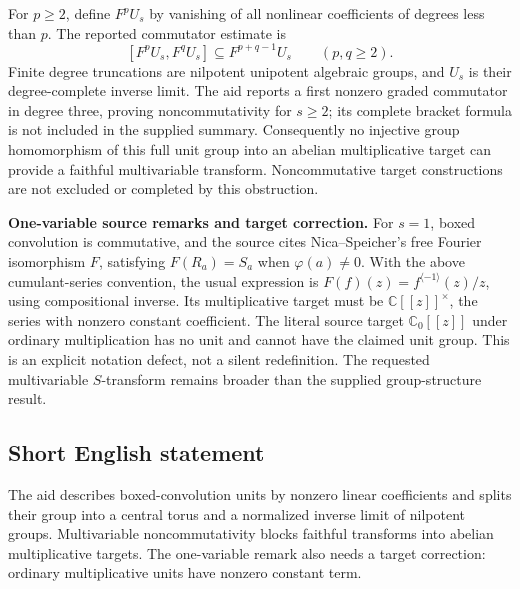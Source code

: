 \documentclass[11pt]{article}
\newcommand{\C}{\mathbb{C}}
\begin{document}
For \(p\geq2\), define \(F^pU_s\) by vanishing of all nonlinear coefficients of degrees less than \(p\). The reported commutator estimate is
\[
 [F^pU_s,F^qU_s]\subseteq F^{p+q-1}U_s\qquad(p,q\geq2).
\]
Finite degree truncations are nilpotent unipotent algebraic groups, and \(U_s\) is their degree-complete inverse limit. The aid reports a first nonzero graded commutator in degree three, proving noncommutativity for \(s\geq2\); its complete bracket formula is not included in the supplied summary. Consequently no injective group homomorphism of this full unit group into an abelian multiplicative target can provide a faithful multivariable transform. Noncommutative target constructions are not excluded or completed by this obstruction.

\textbf{One-variable source remarks and target correction.} For \(s=1\), boxed convolution is commutative, and the source cites Nica--Speicher's free Fourier isomorphism \(F\), satisfying \(F(R_a)=S_a\) when \(\varphi(a)\ne0\). With the above cumulant-series convention, the usual expression is \(F(f)(z)=f^{\langle-1\rangle}(z)/z\), using compositional inverse. Its multiplicative target must be \(\C[[z]]^\times\), the series with nonzero constant coefficient. The literal source target \(\C_0[[z]]\) under ordinary multiplication has no unit and cannot have the claimed unit group. This is an explicit notation defect, not a silent redefinition. The requested multivariable \(S\)-transform remains broader than the supplied group-structure result.
\subsection{Short English statement}
The aid describes boxed-convolution units by nonzero linear coefficients and splits their group into a central torus and a normalized inverse limit of nilpotent groups. Multivariable noncommutativity blocks faithful transforms into abelian multiplicative targets. The one-variable remark also needs a target correction: ordinary multiplicative units have nonzero constant term.
\end{document}
